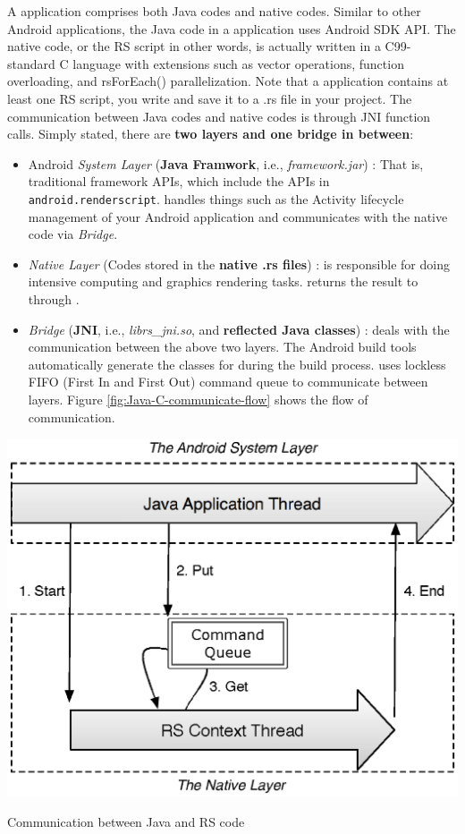 A \RS{} application comprises both Java codes and native codes. Similar to other Android applications, the Java code in a \RS{} application uses Android SDK API. The native code, or the RS script in other words, is actually written in a C99-standard C language with extensions such as vector operations, function overloading, and rsForEach() parallelization. Note that a \RS{} application contains at least one RS script, you write and save it to a .rs file in your project. 
The communication between Java codes and native codes is through JNI function calls. Simply stated, there are \textbf{two layers and one bridge in between}:
\begin{itemize}
\item Android \textit{System Layer} (\textbf{Java Framwork}, i.e., \textit{framework.jar}) : That is, traditional framework APIs, which include the \RS{} APIs in \verb|android.renderscript|. \Client{} handles things such as the Activity lifecycle management of your Android application and communicates with the native \RS{} code via \textit{Bridge}.
\item \textit{Native Layer} (Codes stored in the \textbf{native .rs files}) : \Core{} is responsible for doing intensive computing and graphics rendering tasks. \Core{} returns the result to \Client{} through \Bridge{}. 
\item \textit{Bridge} (\textbf{JNI}, i.e., \textit{librs\_jni.so}, and \textbf{reflected Java classes}) : \Bridge{} deals with the communication between the above two layers. The Android build tools automatically generate the classes for \Bridge{} during the build process. \RS{} uses lockless FIFO (First In and First Out) command queue to communicate between layers. Figure \ref{fig:Java-C-communicate-flow} shows the flow of communication.
\end{itemize}

\begin{center-figure}
    \includegraphics[scale=0.8]{fig/LocklessFifo.eps}
    \caption{Communication between Java and RS code}
    \label{fig:Java-C-communicate-flow}
\end{center-figure}

